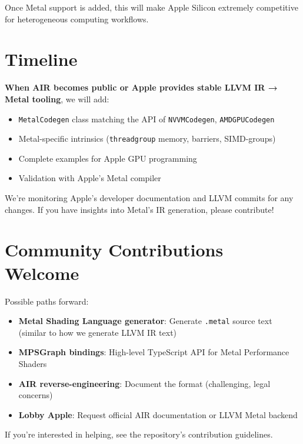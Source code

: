 \documentclass[11pt,oneside]{book}
\begin{document}
Once Metal support is added, this will make Apple Silicon extremely competitive for heterogeneous computing workflows.

\section{Timeline}

\textbf{When AIR becomes public or Apple provides stable LLVM IR → Metal tooling}, we will add:

\begin{itemize}[noitemsep]
  \item \texttt{MetalCodegen} class matching the API of \texttt{NVVMCodegen}, \texttt{AMDGPUCodegen}
  \item Metal-specific intrinsics (\texttt{threadgroup} memory, barriers, SIMD-groups)
  \item Complete examples for Apple GPU programming
  \item Validation with Apple's Metal compiler
\end{itemize}

We're monitoring Apple's developer documentation and LLVM commits for any changes. If you have insights into Metal's IR generation, please contribute!

\section{Community Contributions Welcome}

Possible paths forward:
\begin{itemize}[noitemsep]
  \item \textbf{Metal Shading Language generator}: Generate \texttt{.metal} source text (similar to how we generate LLVM IR text)
  \item \textbf{MPSGraph bindings}: High-level TypeScript API for Metal Performance Shaders
  \item \textbf{AIR reverse-engineering}: Document the format (challenging, legal concerns)
  \item \textbf{Lobby Apple}: Request official AIR documentation or LLVM Metal backend
\end{itemize}

If you're interested in helping, see the repository's contribution guidelines.

\backmatter
\end{document}
